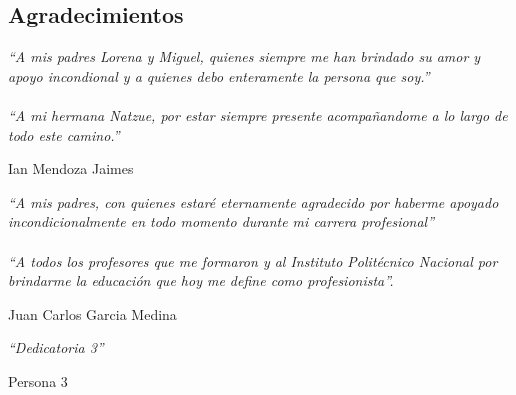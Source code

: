 
\begin{comment}
\begin{acknowledgements}

También quisiera reconocer a ... por ...CONACYT,  PAPIIT / etc.
\end{acknowledgements}
\end{comment}

\begin{alwayssingle}
	{
		\pagestyle{empty}
		\vspace{1.5cm}
		{\chapter*{Agradecimientos}
			\noindent 
			\textit{``A mis padres Lorena y Miguel, quienes siempre me han brindado su amor y apoyo incondional y a quienes debo enteramente la persona que soy.''} \\
			\\
			\textit{``A mi hermana Natzue, por estar siempre presente acompañandome a lo largo de todo este camino.''}
			\begin{flushright}
				Ian Mendoza Jaimes
			\end{flushright}
			\noindent 
			\textit{``A mis padres, con quienes estaré eternamente agradecido por haberme apoyado incondicionalmente en todo momento durante mi carrera profesional'' }\\
			\\
			\textit{ ``A todos los profesores que me formaron y al Instituto Politécnico Nacional por brindarme la educación que hoy me define como profesionista''.}

			\begin{flushright}
				Juan Carlos Garcia Medina
			\end{flushright}
			\noindent 
			\textit{``Dedicatoria 3''}
			\begin{flushright}
				Persona 3
			\end{flushright}
			
		}
	}
	
\end{alwayssingle}



